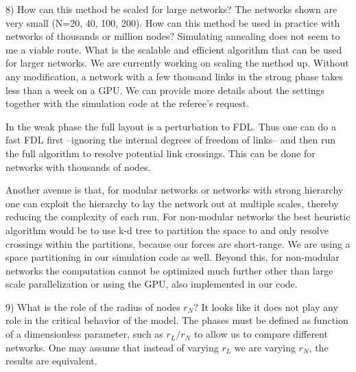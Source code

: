 \documentclass[11pt]{article}
\begin{document}
\begin{response}{
8) How can this method be scaled for large networks? The networks shown are very small (N=20, 40, 100, 200). How can this method be used in practice with networks of thousands or million nodes? Simulating annealing does not seem to me a viable route. What is the scalable and efficient algorithm that can be used for larger networks. 
}
We are currently working on scaling the method up. 
Without any modification, a network with a few thousand links in the strong phase takes less than a week on a GPU. 
We can provide more details about the settings together with the simulation code at the referee's request. 

In the weak phase the full layout is a perturbation to FDL. 
Thus one can do a fast FDL first --ignoring the internal degrees of freedom of links-- and then run the full algorithm to resolve potential link crossings. 
This can be done for networks with thousands of nodes. 

Another avenue is that, for modular networks or networks with strong hierarchy one can exploit the hierarchy to lay the network out at multiple scales, thereby reducing the complexity of each run. 
For non-modular networks the best heuristic algorithm would be to use k-d tree to partition the space to and only resolve crossings within the partitions, because our forces are short-range. 
We are using a space partitioning in our simulation code as well. 
Beyond this, for non-modular networks the computation cannot be optimized much further other than large scale parallelization or using the GPU, also implemented in our code.


\end{response}
\begin{response}{
9) What is the role of the radius of nodes $r_N$? It looks like it does not play any role in the critical behavior of the model. 
}
The phases must be defined as function of a dimensionless parameter, such as $r_L/r_N$ to allow us to compare different networks. 
One may assume that instead of varying $r_L$ we are varying $r_N$, the results are equivalent. 

\end{response}
\end{document}
